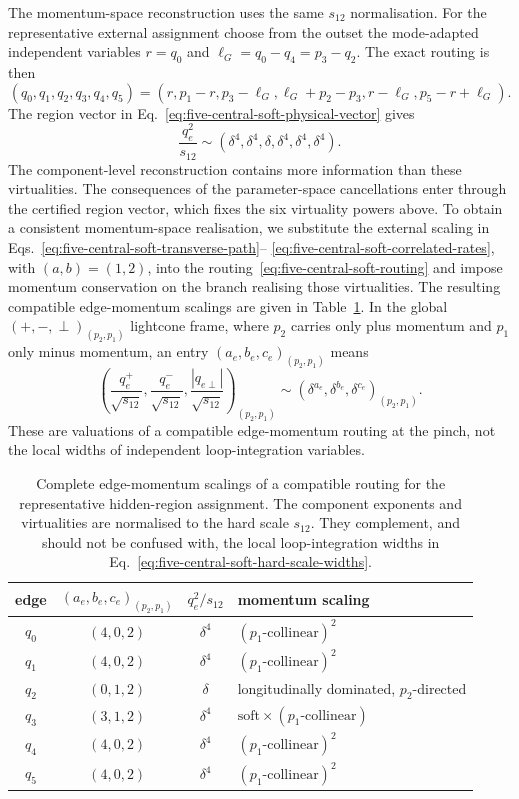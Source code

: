 \documentclass[a4paper,11pt]{article}
\begin{document}
The momentum-space reconstruction uses the same \(s_{12}\) normalisation.
For the representative external assignment choose from the outset the
mode-adapted independent variables
\(r=q_0\) and \(\ell_G=q_0-q_4=p_3-q_2\).  The exact routing is then
\begin{equation}
 (q_0,q_1,q_2,q_3,q_4,q_5)
 =(r,p_1-r,p_3-\ell_G,\ell_G+p_2-p_3,
   r-\ell_G,p_5-r+\ell_G).
 \label{eq:five-central-soft-routing}
\end{equation}
The region vector in Eq.~\eqref{eq:five-central-soft-physical-vector} gives
\[
 \frac{q_e^2}{s_{12}}
 \sim(\delta^4,\delta^4,\delta,\delta^4,\delta^4,\delta^4).
\]
The component-level reconstruction contains more information than these
virtualities.  The consequences of the parameter-space cancellations enter
through the certified region vector, which fixes the six virtuality powers
above.  To obtain a consistent momentum-space realisation, we substitute the
external scaling in
Eqs.~\eqref{eq:five-central-soft-transverse-path}--
\eqref{eq:five-central-soft-correlated-rates}, with \((a,b)=(1,2)\), into
the routing~\eqref{eq:five-central-soft-routing} and impose momentum
conservation on the branch realising those virtualities.  The resulting
compatible edge-momentum scalings are given in
Table~\ref{tab:five-central-soft-edge-scalings}.  In the global
\((+,-,\perp)_{(p_2,p_1)}\) lightcone frame, where \(p_2\) carries only plus
momentum and \(p_1\) only minus momentum, an
entry \((a_e,b_e,c_e)_{(p_2,p_1)}\) means
\[
 \left(\frac{q_e^+}{\sqrt{s_{12}}},
       \frac{q_e^-}{\sqrt{s_{12}}},
       \frac{|q_{e\perp}|}{\sqrt{s_{12}}}\right)_{(p_2,p_1)}
 \sim(\delta^{a_e},\delta^{b_e},\delta^{c_e})_{(p_2,p_1)}.
\]
These are valuations of a compatible edge-momentum routing at the pinch, not
the local widths of independent loop-integration variables.
\begin{table}[H]
\centering
\small
\begin{tabular}{@{}c c c l@{}}
\toprule
edge & \((a_e,b_e,c_e)_{(p_2,p_1)}\) & \(q_e^2/s_{12}\) & momentum scaling\\
\midrule
\(q_0\) & \((4,0,2)\) & \(\delta^4\) & \((p_1\text{-collinear})^2\)\\
\(q_1\) & \((4,0,2)\) & \(\delta^4\) & \((p_1\text{-collinear})^2\)\\
\(q_2\) & \((0,1,2)\) & \(\delta\)   & longitudinally dominated, \(p_2\)-directed\\
\(q_3\) & \((3,1,2)\) & \(\delta^4\) &
\(\text{soft}\times(p_1\text{-collinear})\)\\
\(q_4\) & \((4,0,2)\) & \(\delta^4\) & \((p_1\text{-collinear})^2\)\\
\(q_5\) & \((4,0,2)\) & \(\delta^4\) & \((p_1\text{-collinear})^2\)\\
\bottomrule
\end{tabular}
\caption{Complete edge-momentum scalings of a compatible routing for the representative
hidden-region assignment.  The component exponents and virtualities are
normalised to the hard scale \(s_{12}\).  They complement, and should not be
confused with, the local loop-integration widths in
Eq.~\eqref{eq:five-central-soft-hard-scale-widths}.}
\label{tab:five-central-soft-edge-scalings}
\end{table}
\end{document}
